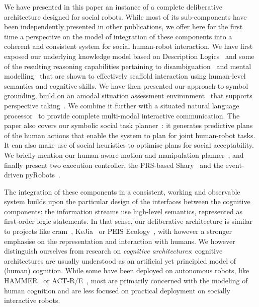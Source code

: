 \documentclass[preprint,3p,times]{elsarticle}
\begin{document}
We have presented in this paper an instance of a complete deliberative architecture designed for
social robots. While most of its sub-components have been independently
presented in other publications, we offer here for the first time a perspective
on the model of integration of these components into a coherent and consistent
system for social human-robot interaction. We have first exposed our underlying
knowledge model based on Description Logics~\cite{Lemaignan2010} and some of the
resulting reasoning capabilities pertaining to disambiguation~\cite{Ros2010b}
and mental modelling~\cite{warnier2012when} that are shown to effectively
scaffold interaction using human-level semantics and cognitive skills. We have
then presented our approach to symbol grounding, build on an amodal situation
assessment environment~\cite{Sisbot2011} that supports perspective
taking~\cite{Marin2008,Ros2010}. We combine it further with a situated natural
language processor~\cite{Lemaignan2011a} to provide complete multi-modal
interactive communication.  The paper also covers our symbolic social task
planner~\cite{Alili2008, Alili2009, Lallement2014}: it generates predictive
plans of the human actions that enable the system to plan for joint human-robot
tasks. It can also make use of social heuristics to optimise plans for social
acceptability. We briefly mention our human-aware motion and manipulation
planner~\cite{Sisbot2007,Sisbot2008,Mainprice2011,Pandey2011,sisbot2012human,kruse2013human}, and finally present two
execution controller, the PRS-based {\sc
Shary}~\cite{clodic2009,fiore2014,clodic2014key}
and the event-driven {\sc pyRobots}~\cite{lemaignan2015pyrobots}.

The integration of these components in a consistent, working and observable
system builds upon the particular design of the interfaces between the cognitive
components: the information streams use high-level semantics, represented as
first-order logic statements. In that sense, our deliberative architecture is
similar to projects like {\sc cram}~\cite{Beetz2010}, KeJia~\cite{Chen2010} or
PEIS Ecology~\cite{saffiotti2005peis, daoutis2012cooperative}, with however a
stronger emphasise on the representation and interaction with humans. We however
distinguish ourselves from research on \emph{cognitive architectures}: cognitive
architectures are usually understood as an artificial yet principled model of
(human) cognition. While some have been deployed on autonomous robots, like
HAMMER~\cite{demiris2006hierarchical} or ACT-R/E~\cite{trafton2013act}, most are
primarily concerned with the modeling of human cognition and are less focused on
practical deployment on socially interactive robots.
\end{document}
